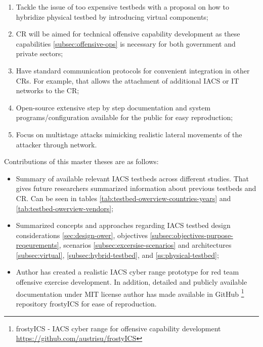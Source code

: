 \begin{enumerate}
	\item Tackle the issue of too expensive testbeds with a proposal on how to hybridize physical testbed by introducing virtual components;
	
	\item CR will be aimed for technical offensive capability development as these capabilities \ref{subsec:offensive-ops} is necessary for both government and private sectors;
	
	\item Have standard communication protocols for convenient integration in other CRs. For example, that allows the attachment of additional IACS or IT networks to the CR;
	
	\item Open-source extensive step by step documentation and system programs/configuration available for the public for easy reproduction;
	
	\item Focus on multistage attacks mimicking realistic lateral movements of the attacker through network.
	
\end{enumerate}



Contributions of this master theses are as follows:

\begin{itemize}
	\item Summary of available relevant IACS testbeds across different studies. That gives future researchers summarized information about previous testbeds and CR. Can be seen in tables \ref{tab:testbed-owerview-countries-years} and \ref{tab:testbed-owerview-vendors}; 
	
	\item Summarized concepts and approaches regarding IACS testbed design considerations \ref{sec:design-ower}, objectives \ref{subsec:objectives-purpose-reqeurements}, scenarios \ref{subsec:excersise-scenarios} and architectures \ref{subsec:virtual}, \ref{subsec:hybrid-testbed}, and \ref{ss:physical-testbed};
	
	\item Author has created a realistic IACS cyber range prototype for red team offensive exercise development. In addition, detailed and publicly available documentation under MIT license author has made available in GitHub \footnote{frostyICS - IACS cyber range for offensive capability development \url{https://github.com/austrisu/frostyICS}} repository frostyICS for ease of reproduction.
	
\end{itemize}